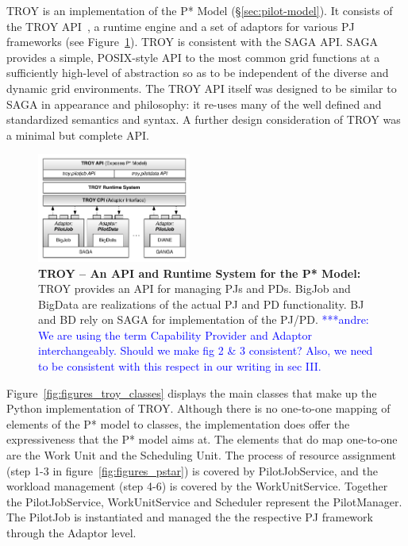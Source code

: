 \documentclass[conference,final]{IEEEtran}
\newcommand{\alnote}[1]{ {\textcolor{blue} { ***andre: #1 }}}
\newcommand{\amnote}[1]{ {\textcolor{blue} { ***andre2: #1 }}}
\newcommand{\alnote}[1]{}
\newcommand{\amnote}[1]{}
\begin{document}

TROY is an implementation of the P* Model
(\S\ref{sec:pilot-model}). It consists of the TROY API~\cite{troy_api}, a
runtime engine and a set of adaptors for various PJ frameworks (see
Figure~\ref{fig:figures_pstar_troy}). TROY is consistent with the SAGA
API. SAGA~\cite{saga_url,saga_gfd90} provides a simple, POSIX-style
API to the most common grid functions at a sufficiently high-level of
abstraction so as to be independent of the diverse and dynamic grid
environments. The TROY API itself was designed to be similar to SAGA
in appearance and philosophy: it re-uses many of the well defined and
standardized semantics and syntax. A further design consideration of
TROY was a minimal but complete API.


\begin{figure}[t]
	\centering
		\includegraphics[width=0.45\textwidth]{figures/TROY_arch.pdf}
                \caption{\textbf{TROY -- An API and Runtime System for
                    the P* Model:} TROY provides an API for managing
                  PJs and PDs. BigJob and BigData are realizations of
                  the actual PJ and PD functionality. BJ and BD rely
                  on SAGA for implementation of the PJ/PD.\alnote{We
                    are using the term Capability Provider and Adaptor
                    interchangeably. Should we make fig 2 \& 3
                    consistent? Also, we need to be consistent with
                    this respect in our writing in sec III.}  }
	\label{fig:figures_pstar_troy}
\end{figure}

Figure~\ref{fig:figures_troy_classes} displays the main classes that
make up the Python implementation of TROY.  Although there is no
one-to-one mapping of elements of the P* model to classes, the
implementation does offer the expressiveness that the P* model aims
at. The elements that do map one-to-one are the Work Unit and the Scheduling Unit.
The process of resource assignment (step 1-3 in figure~\ref{fig:figures_pstar})
is covered by PilotJobService, and the workload management (step 4-6) is covered by the WorkUnitService.
Together the PilotJobService, WorkUnitService and Scheduler represent the PilotManager.
The PilotJob is instantiated and managed the the respective PJ framework through the Adaptor level.
\end{document}
